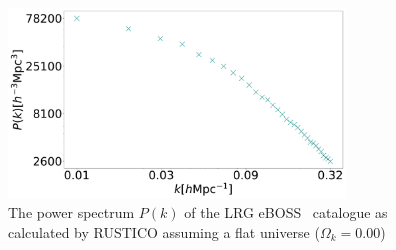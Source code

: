 \begin{figure}[t]
	\centering
	\includegraphics[width=0.8\textwidth]{../figs/Pkrustico.pdf}
	\caption[Power spectrum of the LRG eBOSS galaxies.]{The power spectrum $P(k)$ of the LRG eBOSS~\cite{eBoss} catalogue as calculated by RUSTICO assuming a flat universe ($\Omega_k = 0.00$)}
	\label{fig:rustico}
\end{figure}


